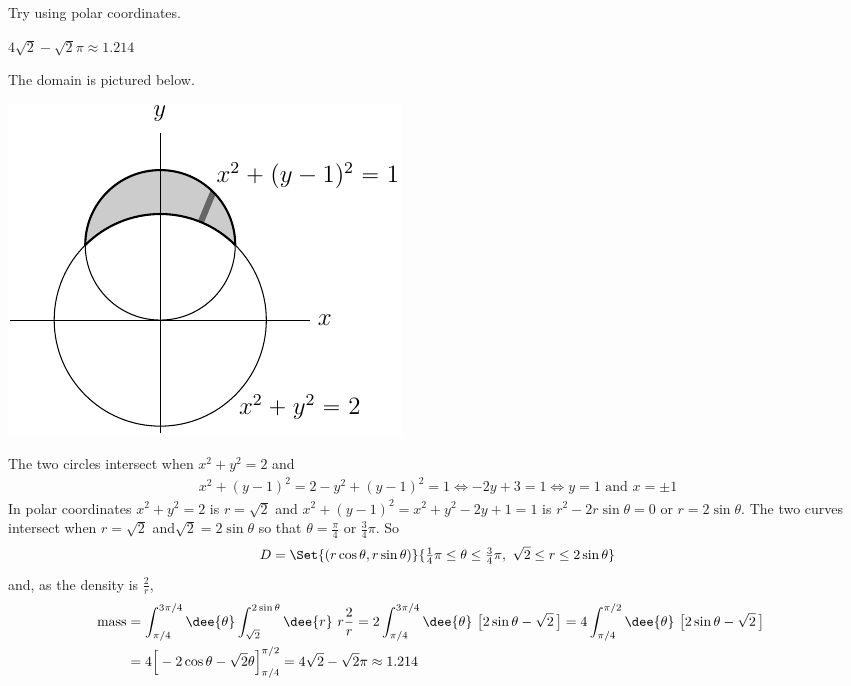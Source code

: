 \begin{hint}
Try using polar coordinates.
\end{hint}

\begin{answer}
$4\sqrt{2} -\sqrt{2}\pi\approx 1.214$
\end{answer}

\begin{solution}
The domain is pictured below.
\begin{center}
     \includegraphics{fig/OE02DQ7.pdf}
\end{center}
The two circles intersect when $x^2+y^2=2$ and
\begin{align*}
x^2+(y-1)^2=2-y^2+(y-1)^2=1
\iff -2y+3=1\iff y=1\text{ and } x=\pm 1
\end{align*}
In polar coordinates $x^2+y^2=2$ is $r=\sqrt{2}$ and 
$x^2+(y-1)^2=x^2+y^2-2y+1=1$ is $r^2-2r\sin\theta=0$ or $r=2\sin\theta$.
The two curves intersect when $r=\sqrt{2}$ and$\sqrt{2}=2\sin\theta$ so that 
$\theta=\frac{\pi}{4}$ or $\frac{3}{4}\pi$. So 
\begin{equation*}
D=\Set{(r\cos\theta,r\sin\theta)}{\tfrac{1}{4}\pi\le\theta\le\tfrac{3}{4}\pi,\ 
          \sqrt{2}\le r\le 2\sin\theta}
\end{equation*}
and, as the density is $\frac{2}{r}$,
\begin{align*}
\text{mass}
&=\int_{\pi/4}^{3\pi/4}\dee{\theta}\int^{2\sin\theta}_{\sqrt{2}}\dee{r}\ 
          r\frac{2}{r}
=2\int_{\pi/4}^{3\pi/4}\dee{\theta}\ \big[2\sin\theta -\sqrt{2}\,\big]
=4\int_{\pi/4}^{\pi/2}\dee{\theta}\ \big[2\sin\theta -\sqrt{2}\,\big] \cr
&=4\Big[-2\cos\theta -\sqrt{2}\theta\Big] _{\pi/4}^{\pi/2}
=4\sqrt{2} -\sqrt{2}\pi\approx 1.214
\end{align*}
\end{solution}


